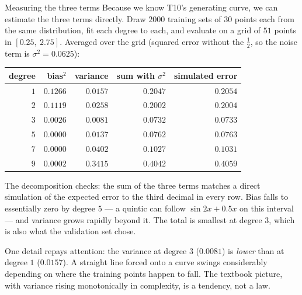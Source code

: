 \begin{workedexample}{Measuring the three terms}
Because we know T10's generating curve, we can estimate the three terms
directly. Draw $2000$ training sets of $30$ points each from the same
distribution, fit each degree to each, and evaluate on a grid of $51$ points in
$[0.25,\ 2.75]$. Averaged over the grid (squared error without the $\frac12$,
so the noise term is $\sigma^2 = 0.0625$):

\begin{center}
\small
\renewcommand{\arraystretch}{1.15}
\begin{tabular}{@{}rrrrr@{}}
\toprule
degree & bias$^2$ & variance & sum with $\sigma^2$ & simulated error\\
\midrule
$1$ & $0.1266$ & $0.0157$ & $0.2047$ & $0.2054$\\
$2$ & $0.1119$ & $0.0258$ & $0.2002$ & $0.2004$\\
$3$ & $0.0026$ & $0.0081$ & $\mathbf{0.0732}$ & $0.0733$\\
$5$ & $0.0000$ & $0.0137$ & $0.0762$ & $0.0763$\\
$7$ & $0.0000$ & $0.0402$ & $0.1027$ & $0.1031$\\
$9$ & $0.0002$ & $0.3415$ & $0.4042$ & $0.4059$\\
\bottomrule
\end{tabular}
\end{center}

The decomposition checks: the sum of the three terms matches a direct simulation
of the expected error to the third decimal in every row. Bias falls to
essentially zero by degree $5$ --- a quintic can follow $\sin 2x + 0.5x$ on this
interval --- and variance grows rapidly beyond it. The total is smallest at
degree $3$, which is also what the validation set chose.

One detail repays attention: the variance at degree $3$ ($0.0081$) is
\emph{lower} than at degree $1$ ($0.0157$). A straight line forced onto a curve
swings considerably depending on where the training points happen to fall. The
textbook picture, with variance rising monotonically in complexity, is a
tendency, not a law.
\end{workedexample}


